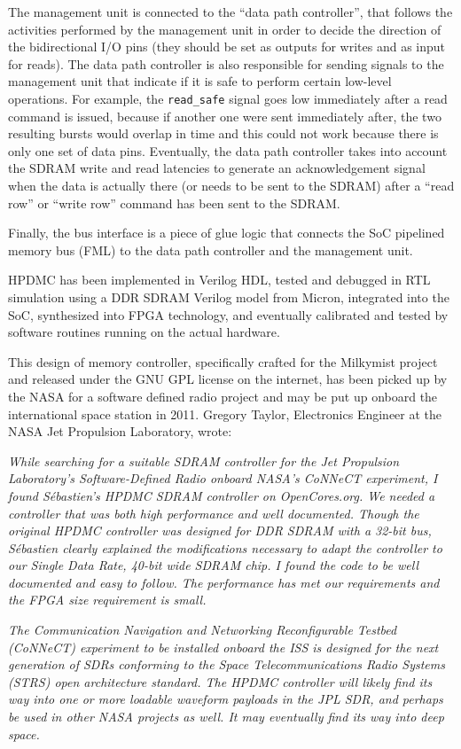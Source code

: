 \documentclass[a4paper,11pt]{kthesis}
\begin{document}
The management unit is connected to the ``data path controller'', that follows the activities performed by the management unit in order to decide the direction of the bidirectional I/O pins (they should be set as outputs for writes and as input for reads). The data path controller is also responsible for sending signals to the management unit that indicate if it is safe to perform certain low-level operations. For example, the \verb!read_safe! signal goes low immediately after a read command is issued, because if another one were sent immediately after, the two resulting bursts would overlap in time and this could not work because there is only one set of data pins. Eventually, the data path controller takes into account the SDRAM write and read latencies to generate an acknowledgement signal when the data is actually there (or needs to be sent to the SDRAM) after a ``read row'' or ``write row'' command has been sent to the SDRAM.

Finally, the bus interface is a piece of glue logic that connects the SoC pipelined memory bus (FML) to the data path controller and the management unit.

HPDMC has been implemented in Verilog HDL, tested and debugged in RTL simulation using a DDR SDRAM Verilog model from Micron, integrated into the SoC, synthesized into FPGA technology, and eventually calibrated and tested by software routines running on the actual hardware.

This design of memory controller, specifically crafted for the Milkymist project and released under the GNU GPL license on the internet, has been picked up by the NASA for a software defined radio project and may be put up onboard the international space station in 2011. Gregory Taylor, Electronics Engineer at the NASA Jet Propulsion Laboratory, wrote:

\textit{While searching for a suitable SDRAM controller for the Jet Propulsion Laboratory's Software-Defined Radio onboard NASA's CoNNeCT experiment, I found S\'ebastien's HPDMC SDRAM controller on OpenCores.org. We needed a controller that was both high performance and well documented. Though the original HPDMC controller was designed for DDR SDRAM with a 32-bit bus, S\'ebastien clearly explained the modifications necessary to adapt the controller to our Single Data Rate, 40-bit wide SDRAM chip. I found the code to be well documented and easy to follow. The performance has met our requirements and the FPGA size requirement is small.}

\textit{The Communication Navigation and Networking Reconfigurable Testbed (CoNNeCT) experiment to be installed onboard the ISS is designed for the next generation of SDRs conforming to the Space Telecommunications Radio Systems (STRS) open architecture standard. The HPDMC controller will likely find its way into one or more loadable waveform payloads in the JPL SDR, and perhaps be used in other NASA projects as well. It may eventually find its way into deep space.}
\end{document}

